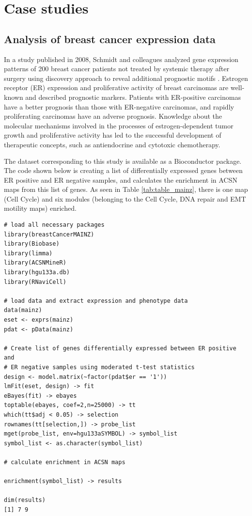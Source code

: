 \documentclass{article}
\begin{document}
\section[Case studies]{Case studies}

\subsection{Analysis of breast cancer expression data}
In a study published in 2008, Schmidt and colleagues analyzed gene expression
patterns of 200 breast cancer patients not treated by systemic therapy after
surgery using discovery approach to reveal additional prognostic motifs
\cite{schmidt2008humoral}. Estrogen receptor (ER) expression and proliferative
activity of breast carcinomas are well-known and described prognostic markers.
Patients with ER-positive carcinomas have a better prognosis than those with
ER-negative carcinomas, and rapidly proliferating carcinomas have an adverse
prognosis. Knowledge about the molecular mechanisms involved in the
processes of estrogen-dependent tumor growth and proliferative activity has led
to the successful development of therapeutic concepts, such as  antiendocrine and
cytotoxic chemotherapy. 

The dataset corresponding to this study is available as a Bioconductor package.
The code shown below is creating a list of differentially expressed genes
between ER positive and ER negative samples, and calculates the enrichment in
ACSN maps from this list of genes. As seen in Table \ref{tab:table_mainz},
there is one map (Cell Cycle) and six modules (belonging to the Cell Cycle, DNA
repair and EMT motility maps) enriched. 

\begin{verbatim}
# load all necessary packages
library(breastCancerMAINZ)
library(Biobase)
library(limma)
library(ACSNMineR)
library(hgu133a.db)
library(RNaviCell)

# load data and extract expression and phenotype data 
data(mainz)
eset <- exprs(mainz)
pdat <- pData(mainz)

# Create list of genes differentially expressed between ER positive and 
# ER negative samples using moderated t-test statistics 
design <- model.matrix(~factor(pdat$er == '1'))
lmFit(eset, design) -> fit
eBayes(fit) -> ebayes
toptable(ebayes, coef=2,n=25000) -> tt
which(tt$adj < 0.05) -> selection
rownames(tt[selection,]) -> probe_list
mget(probe_list, env=hgu133aSYMBOL) -> symbol_list
symbol_list <- as.character(symbol_list)

# calculate enrichment in ACSN maps 

enrichment(symbol_list) -> results

dim(results)
[1] 7 9
\end{verbatim}
\end{document}
